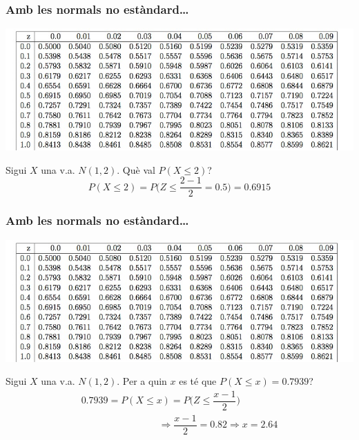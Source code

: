 \documentclass[12pt,t]{beamer}\usepackage[]{graphicx}\usepackage[]{color}
\renewcommand{\leq}{\leqslant}
\theoremstyle{plain}
\theoremstyle{definition}
\begin{document}
\begin{frame}
\frametitle{Amb les normals no estàndard\ldots}
\vspace*{-1cm}

\begin{center}
\hspace*{-0.4cm}\includegraphics[width=1.1\linewidth]{tabla.jpg}
\end{center}

Sigui $X$ una v.a. $N(1,2)$. Què val $P(X\leq 2)$?
$$
P(X\leq 2)=P\Big(Z\leq\frac{2-1}{2}=0.5\Big)=0.6915
$$

\end{frame}

\begin{frame}
\frametitle{Amb les normals no estàndard\ldots}
\vspace*{-1cm}

\begin{center}
\hspace*{-0.4cm}\includegraphics[width=1.1\linewidth]{tabla.jpg}
\end{center}

Sigui $X$ una v.a. $N(1,2)$. Per a quin $x$ es té que $P(X\leq x)=0.7939$?
$$
\begin{array}{l}
0.7939=P(X\leq x)=P\Big(Z\leq\dfrac{x-1}{2}\Big)\\[1ex]\qquad\qquad\qquad\qquad \Rightarrow \dfrac{x-1}{2}=0.82
\Rightarrow x=2.64
\end{array}
$$

\end{frame}
\end{document}
